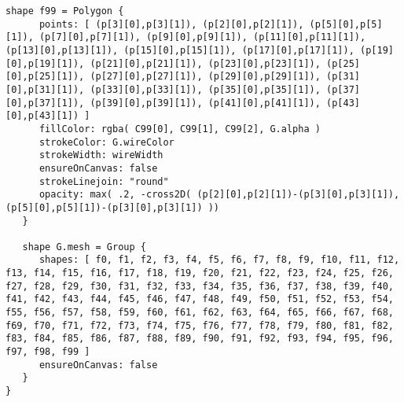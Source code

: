 \begin{lstlisting}[language=Sty-RT,escapechar=@]
   shape f99 = Polygon {
      points: [ (p[3][0],p[3][1]), (p[2][0],p[2][1]), (p[5][0],p[5][1]), (p[7][0],p[7][1]), (p[9][0],p[9][1]), (p[11][0],p[11][1]), (p[13][0],p[13][1]), (p[15][0],p[15][1]), (p[17][0],p[17][1]), (p[19][0],p[19][1]), (p[21][0],p[21][1]), (p[23][0],p[23][1]), (p[25][0],p[25][1]), (p[27][0],p[27][1]), (p[29][0],p[29][1]), (p[31][0],p[31][1]), (p[33][0],p[33][1]), (p[35][0],p[35][1]), (p[37][0],p[37][1]), (p[39][0],p[39][1]), (p[41][0],p[41][1]), (p[43][0],p[43][1]) ]
      fillColor: rgba( C99[0], C99[1], C99[2], G.alpha )
      strokeColor: G.wireColor
      strokeWidth: wireWidth
      ensureOnCanvas: false
      strokeLinejoin: "round"
      opacity: max( .2, -cross2D( (p[2][0],p[2][1])-(p[3][0],p[3][1]), (p[5][0],p[5][1])-(p[3][0],p[3][1]) ))
   }

   shape G.mesh = Group {
      shapes: [ f0, f1, f2, f3, f4, f5, f6, f7, f8, f9, f10, f11, f12, f13, f14, f15, f16, f17, f18, f19, f20, f21, f22, f23, f24, f25, f26, f27, f28, f29, f30, f31, f32, f33, f34, f35, f36, f37, f38, f39, f40, f41, f42, f43, f44, f45, f46, f47, f48, f49, f50, f51, f52, f53, f54, f55, f56, f57, f58, f59, f60, f61, f62, f63, f64, f65, f66, f67, f68, f69, f70, f71, f72, f73, f74, f75, f76, f77, f78, f79, f80, f81, f82, f83, f84, f85, f86, f87, f88, f89, f90, f91, f92, f93, f94, f95, f96, f97, f98, f99 ]
      ensureOnCanvas: false
   }
}
\end{lstlisting}